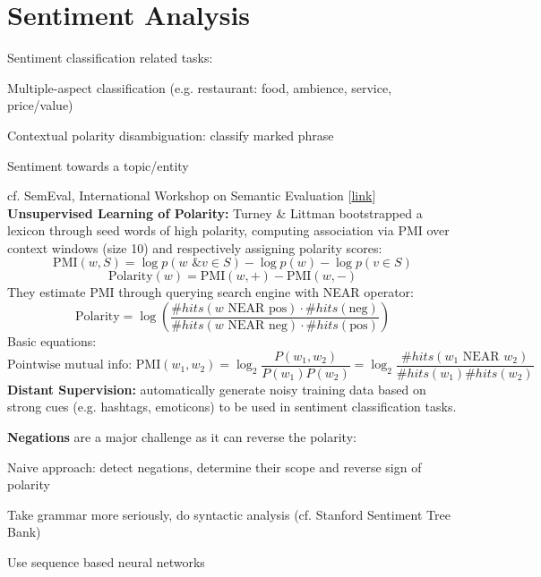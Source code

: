 \documentclass[12pt]{article}
\begin{document}
\section{Sentiment Analysis}
Sentiment classification related tasks:
\ulb
\item Multiple-aspect classification (e.g. restaurant: food, ambience, service, price/value)
\item Contextual polarity disambiguation: classify marked phrase
\item Sentiment towards a topic/entity
\item cf. SemEval, International Workshop on Semantic Evaluation [\href{http://alt.qcri.org/semeval2016/task4/}{link}]
\ule
\textbf{Unsupervised Learning of Polarity:} Turney \& Littman bootstrapped a lexicon through seed words of high polarity, computing association via PMI over context windows (size 10) and respectively assigning polarity scores:
\[ \text{PMI}(w, S) = \log p(w \text{ \& } v \in S) - \log p(w) - \log p(v\in S) \]
\[ \text{Polarity}(w) = \text{PMI}(w, +) - \text{PMI}(w, -) \]
They estimate PMI through querying search engine with NEAR operator:
\[ \text{Polarity} = \log \left( \frac
{\# hits(w \text{ NEAR } \text{pos}) \cdot \# hits (\text{neg})}{\# hits(w \text{ NEAR } \text{neg}) \cdot \# hits (\text{pos})}
\right) \]
Basic equations:
\[ \text{Pointwise mutual info: } \text{PMI}(w_1,w_2) = \log_2 \frac{P(w_1,w_2)}{P(w_1)P(w_2)} = \log_2 \frac{\# hits(w_1 \text{ NEAR } w_2)}{\# hits(w_1)\# hits(w_2)} \]
\textbf{Distant Supervision:} automatically generate noisy training data based on strong cues (e.g. hashtags, emoticons) to be used in sentiment classification tasks.
\par \textbf{Negations} are a major challenge as it can reverse the polarity:
\ulb
\item Naive approach: detect negations, determine their scope and reverse sign of polarity
\item Take grammar more seriously, do syntactic analysis (cf. Stanford Sentiment Tree Bank)
\item Use sequence based neural networks
\ule
\end{document}
